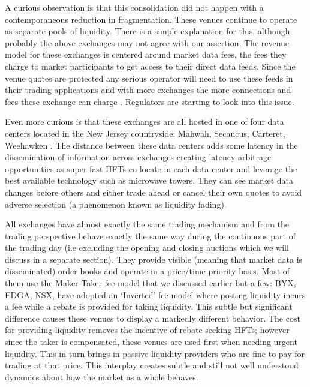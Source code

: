 A curious observation is that this consolidation did not happen with a contemporaneous reduction in fragmentation. These venues continue to operate as separate pools of liquidity. There is a simple explanation for this, although probably the above exchanges may not agree with our assertion. The revenue model for these exchanges is centered around market data fees, the fees they charge to market participants to get access to their direct data feeds. Since the venue quotes are protected any serious operator will need to use these feeds in their trading applications and with more exchanges the more connections and fees these exchange can charge . Regulators are starting to look into this issue.


Even more curious is that these exchanges are all hosted in one of four data centers located in the New Jersey countryside: Mahwah, Secaucus, Carteret, Weehawken . The distance between these data centers adds some latency in the dissemination of information across exchanges creating latency arbitrage opportunities as super fast HFTs co-locate in each data center and leverage the best available technology such as microwave towers. They can see market data changes before others and either trade ahead or cancel their own quotes to avoid adverse selection (a phenomenon known as liquidity fading).


All exchanges have almost exactly the same trading mechanism and from the trading perspective behave exactly the same way during the continuous part of the trading day (i.e excluding the opening and closing auctions which we will discuss in a separate section). They provide visible (meaning that market data is disseminated) order books and operate in a price/time priority basis. Most of them use the Maker-Taker fee model that we discussed earlier but a few: BYX, EDGA, NSX, have adopted an `Inverted' fee model where posting liquidity incurs a fee while a rebate is provided for taking liquidity. This subtle but significant difference causes these venues to display a markedly different behavior. The cost for providing liquidity removes the incentive of rebate seeking HFTs; however since the taker is compensated, these venues are used first when needing urgent liquidity. This in turn brings in passive liquidity providers who are fine to pay for trading at that price. This interplay creates subtle and still not well understood dynamics about how the market as a whole behaves.


